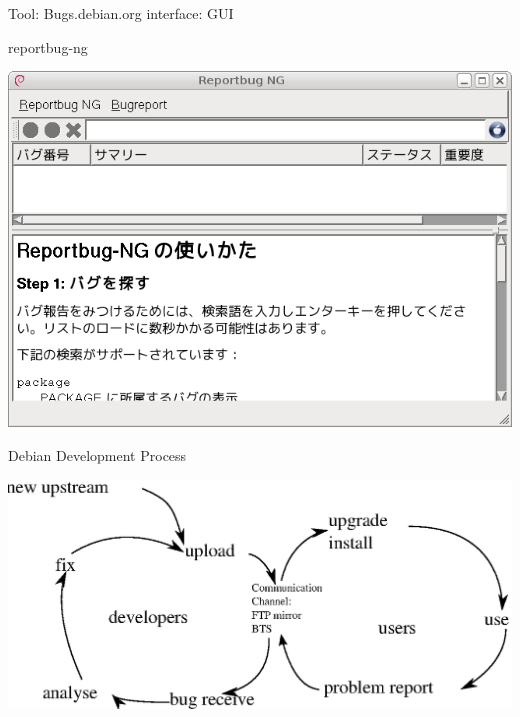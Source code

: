\documentclass[cjk,dvipdfm,12pt]{beamer}
\begin{document}
\begin{frame}{Tool: Bugs.debian.org interface: GUI}

reportbug-ng

 \includegraphics[width=1\hsize]{image200805/reportbug-ng.png}
\end{frame}

\begin{frame}{Debian Development Process}

 \includegraphics[width=1\hsize]{image200805/develcycle.eps} 

\end{frame}
\end{document}
